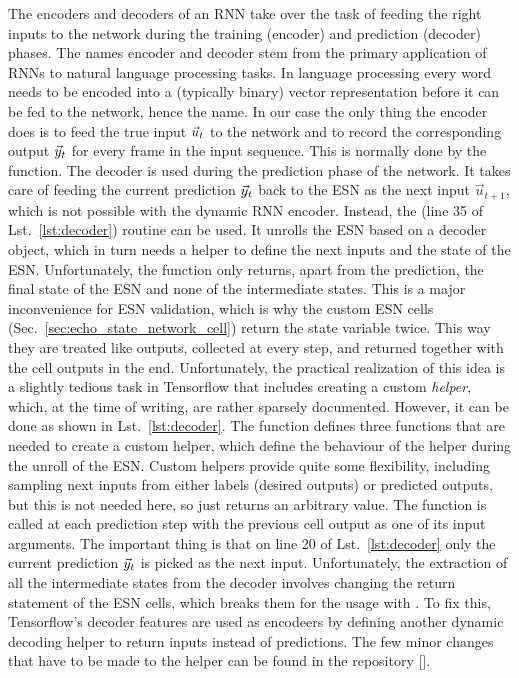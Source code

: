 The encoders and decoders of an RNN take over the task of feeding the right
inputs to the network during the training (encoder) and prediction (decoder)
phases. The names encoder and decoder stem from the primary application of RNNs to
natural language processing tasks.  In language processing every word needs to
be encoded into a (typically binary) vector representation before it can be fed
to the network, hence the name. In our case the only thing the encoder does is
to feed the true input $\vec{u}_t$ to the network and to record the corresponding
output $\vec{y}_t$ for every frame in the input sequence. This is normally done by
the  function.  The decoder is used during the
prediction phase of the network.  It takes care of feeding the current
prediction $\vec{y}_t$ back to the ESN as the next input $\vec{u}_{t+1}$, which is
not possible with the dynamic RNN encoder.  Instead, the
 (line 35 of Lst.~\ref{lst:decoder})
routine can be used. It unrolls the ESN based on a decoder object, which in
turn needs a helper to define the next inputs and the state of the ESN.
Unfortunately, the  function only returns, apart from
the prediction, the final state of the ESN and none of the intermediate states.
This is a major inconvenience for ESN validation, which is why the custom ESN
cells (Sec.~\ref{sec:echo_state_network_cell}) return the state variable twice.
This way they are treated like outputs, collected at every step, and
returned together with the cell outputs in the end.  Unfortunately, the
practical realization of this idea is a slightly tedious task in Tensorflow
that includes creating a custom \emph{helper}, which, at the time of writing,
are rather sparsely documented.  However, it can be done as shown in
Lst.~\ref{lst:decoder}. The  function defines three
functions that are needed to create a custom helper, which define the behaviour
of the helper during the unroll of the ESN.  Custom helpers provide quite some
flexibility, including sampling next inputs from either labels (desired
outputs) or predicted outputs, but this is not needed here, so 
just returns an arbitrary value.  The  function is called
at each prediction step with the previous cell output as one of its input
arguments.  The important thing is that on line 20 of Lst.~\ref{lst:decoder}
only the current prediction $\vec{y}_t$ is picked as the next input.
Unfortunately, the extraction of all the intermediate states from the decoder
involves changing the return statement of the ESN cells, which breaks them for
the usage with . To fix this, Tensorflow's decoder
features are used as encodeers by defining another dynamic decoding helper to
return inputs instead of predictions.  The few minor changes that have to be
made to the helper can be found in the repository [\cite{coderepo}].



